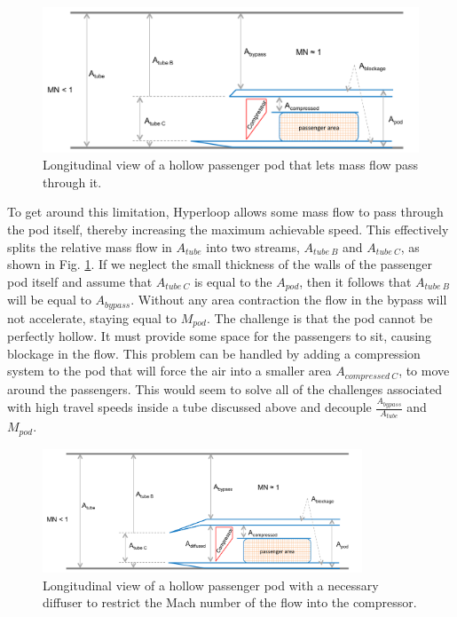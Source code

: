 \documentclass[heading.tex]{subfiles}
\begin{document}
\begin{figure}[hbtp]
\centering
\includegraphics[width=.85\textwidth]{images/hollowCapsule.png}
\caption{Longitudinal view of a hollow passenger pod that lets mass flow pass through it.}
\label{f:hollowPod}
\end{figure}

To get around this limitation, Hyperloop allows some mass flow to pass through the pod itself, thereby increasing
the maximum achievable speed. This effectively splits the relative mass flow in $A_{tube}$ into two streams, 
$A_{tube\ B}$ and  $A_{tube\ C}$, as shown in Fig. \ref{f:hollowPod}. If we neglect the small thickness of the walls of
the passenger pod itself and assume that $A_{tube\ C}$ is equal to the $A_{pod}$, then it follows that $A_{tube\ B}$ 
will be equal to $A_{bypass}$. Without any area contraction the flow in the bypass will not accelerate, staying 
equal to $M_{pod}$. The challenge is that the pod cannot be perfectly hollow. It must provide some space for the passengers
to sit, causing blockage in the flow. This problem can be handled by adding a compression system to the 
pod that will force the air into a smaller area $A_{compressed\ C}$, to move around the passengers. This would 
seem to solve all of the challenges associated with high travel speeds inside a tube discussed above and decouple 
$\frac{A_{bypass}}{A_{tube}}$ and ${M_{pod}}$.


\begin{figure}[hbtp]
\centering
\includegraphics[width=0.85\textwidth]{images/openCapsule.png}
\caption{Longitudinal view of a hollow passenger pod with a necessary diffuser to restrict the Mach number of the flow into the compressor.}
\label{f:OpenPod}
\end{figure}
\end{document}
